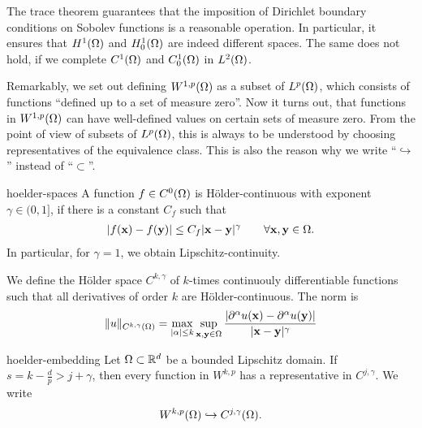 \begin{remark}
  The trace theorem guarantees that the imposition of Dirichlet
  boundary conditions on Sobolev functions is a reasonable
  operation. In particular, it ensures that $H^1(\Omega)$ and
  $H^1_0(\Omega)$ are indeed different spaces. The same does not
  hold, if we complete $C^1(\Omega)$ and $C^1_0(\Omega)$ in
  $L^2(\Omega)$.

  Remarkably, we set out defining $W^{1,p}(\Omega)$ as a subset of
  $L^p(\Omega)$, which consists of functions ``defined up to a set of
  measure zero''. Now it turns out, that functions in
  $W^{1,p}(\Omega)$ can have well-defined values on certain sets of
  measure zero. From the point of view of subsets of $L^p(\Omega)$,
  this is always to be understood by choosing representatives of the
  equivalence class. This is also the reason why we write
  ``$\hookrightarrow$'' instead of ``$\subset$''.
\end{remark}

\begin{Definition}{hoelder-spaces}
  A function $f \in C^0(\Omega)$ is Hölder-continuous with exponent
  $\gamma \in (0,1]$, if there is a constant $C_f$ such that
  \begin{gather}
    \lvert f(\mathbf x)-f(\mathbf y)\rvert \le C_f \lvert\mathbf x-\mathbf y\rvert^\gamma
    \qquad\forall \mathbf x,\mathbf y\in\Omega.
  \end{gather}
  In particular, for $\gamma = 1$, we obtain Lipschitz-continuity.

  We define the Hölder space $C^{k,\gamma}$ of $k$-times continuouly
  differentiable functions such that all derivatives of order $k$ are
  Hölder-continuous. The norm is
  \begin{gather}
    \lVert u\rVert_{C^{k,\gamma}(\Omega)} = \max_{\lvert\alpha\rvert\le k} \sup_{\mathbf x,\mathbf y\in\Omega}
    \frac{\lvert\partial^\alpha u(\mathbf x)-\partial^\alpha u(\mathbf y)\rvert}{\lvert\mathbf x-\mathbf y\rvert^\gamma}
  \end{gather}
\end{Definition}

\begin{Theorem}{hoelder-embedding}
  Let $\Omega\subset\mathbb R^d$ be a bounded Lipschitz domain.
  If $s = k-\tfrac dp > j+\gamma$, then every function in $W^{k,p}$ has a
  representative in $C^{j,\gamma}$. We write
  \begin{gather}
    W^{k,p}(\Omega) \hookrightarrow C^{j,\gamma}(\Omega).
  \end{gather}
\end{Theorem}

